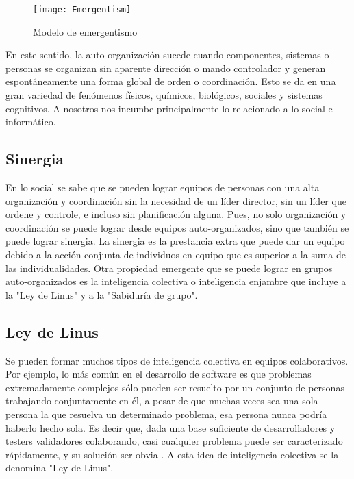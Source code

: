 \begin{figure}[h]
  \centering
  \texttt{[image: Emergentism]}
  \caption{Modelo de emergentismo}
  \centering
  \label{fig:Emergentism} %
\end{figure}

En este sentido, la auto-organización sucede cuando componentes, sistemas o personas se organizan sin aparente dirección o mando controlador y generan espontáneamente una forma global de orden o coordinación. Esto se da en una gran variedad de fenómenos físicos, químicos, biológicos, sociales y sistemas cognitivos. A nosotros nos incumbe principalmente lo relacionado a lo social e informático. 

\subsection{Sinergia}

En lo social se sabe que se pueden lograr equipos de personas con una alta organización y coordinación sin la necesidad de un líder director, sin un líder que ordene y controle, e incluso sin planificación alguna. Pues, no solo organización y coordinación se puede lograr desde equipos auto-organizados, sino que también se puede lograr sinergia. La sinergia es la prestancia extra que puede dar un equipo debido a la acción conjunta de individuos en equipo que es superior a la suma de las individualidades. Otra propiedad emergente que se puede lograr en grupos auto-organizados es la inteligencia colectiva o inteligencia enjambre que incluye a la "Ley de Linus" y a la "Sabiduría de grupo".

\subsection{Ley de Linus}

Se pueden formar muchos tipos de inteligencia colectiva en equipos colaborativos. Por ejemplo, lo más común en el desarrollo de software es que problemas extremadamente complejos sólo pueden ser resuelto por un conjunto de personas trabajando conjuntamente en él, a pesar de que muchas veces sea una sola persona la que resuelva un determinado problema, esa persona nunca podría haberlo hecho sola. Es decir que, dada una base suficiente de desarrolladores y testers validadores colaborando, casi cualquier problema puede ser caracterizado rápidamente, y su solución ser obvia \cite{Eric-Raymond-1997}. A esta idea de inteligencia colectiva se la denomina "Ley de Linus".

